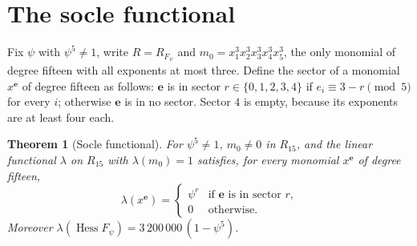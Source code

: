 \documentclass[11pt]{amsart}
\newtheorem{theorem}{Theorem}
\theoremstyle{definition}
\theoremstyle{remark}
\newcommand{\Hess}{\operatorname{Hess}}
\newcommand{\ee}{\mathbf{e}}
\begin{document}
\section{The socle functional}\label{sec:socle}

Fix $\psi$ with $\psi^5\ne1$, write $R=R_{F_\psi}$ and $m_0=x_1^3x_2^3
x_3^3x_4^3x_5^3$, the only monomial of degree fifteen with all exponents at
most three. Define the sector of a monomial $x^{\ee}$ of degree fifteen as
follows: $\ee$ is in sector $r\in\{0,1,2,3,4\}$ if $e_i\equiv 3-r\pmod5$
for every $i$; otherwise $\ee$ is in no sector. Sector $4$ is empty, because
its exponents are at least four each.

\begin{theorem}[Socle functional]\label{thm:socle}
For $\psi^5\ne1$, $m_0\ne0$ in $R_{15}$, and the linear functional
$\lambda$ on $R_{15}$ with $\lambda(m_0)=1$ satisfies, for every monomial
$x^{\ee}$ of degree fifteen,
\[
\lambda(x^{\ee})=\begin{cases}\psi^{r}&\text{if $\ee$ is in sector $r$,}\\
0&\text{otherwise.}\end{cases}
\]
Moreover $\lambda(\Hess F_\psi)=3\,200\,000\,(1-\psi^5)$.
\end{theorem}
\end{document}
